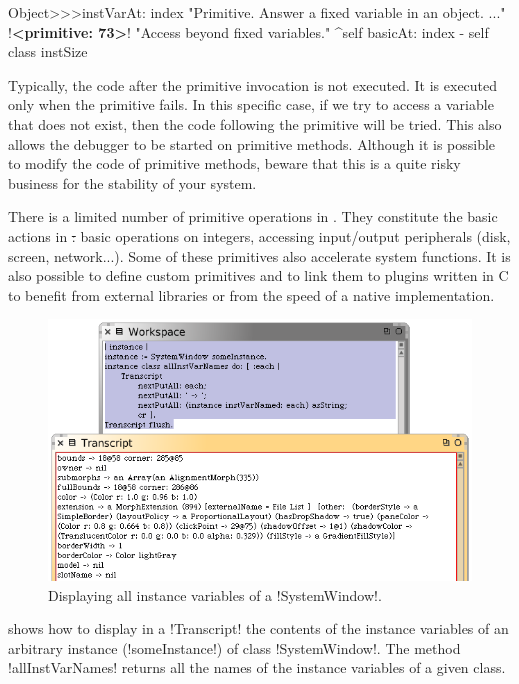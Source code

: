 \documentclass[a4paper,10pt,twoside]{book}
\begin{document}
\begin{code}{}
Object>>>instVarAt: index 
	"Primitive. Answer a fixed variable in an object. ..."
	!\textbf{<primitive: 73>}!
	"Access beyond fixed variables."
	^self basicAt: index - self class instSize		
\end{code}

Typically, the code after the primitive invocation is not executed.
It is executed only when the primitive fails. In this specific case, if we try to access a variable that does not exist, then the code following the primitive will be tried.
This also allows the debugger to be started on primitive methods.
Although it is possible to modify the code of primitive methods, beware that this is a quite risky business for the stability of your \squeak system.

There is a limited number of primitive operations in \squeak. They constitute the basic actions in \st: basic operations on integers, accessing input/output peripherals (disk, screen, network...).
Some of these primitives also accelerate system functions.
It is also possible to define custom primitives and to link them to plugins written in C to benefit from external libraries or from the speed of a native implementation.

\begin{figure}[ht]\centering
	\includegraphics[width=\linewidth]{allInstanceVariables}
	\caption{Displaying all instance variables of a \ct!SystemWindow!.\label{fig:allInstanceVariables}}
\end{figure}

 shows how to display in a \ct!Transcript! the contents of the instance variables of an arbitrary instance (\ct!someInstance!) of class \ct!SystemWindow!.
The method \ct!allInstVarNames! returns all the names of the instance variables of a given class.
\end{document}
